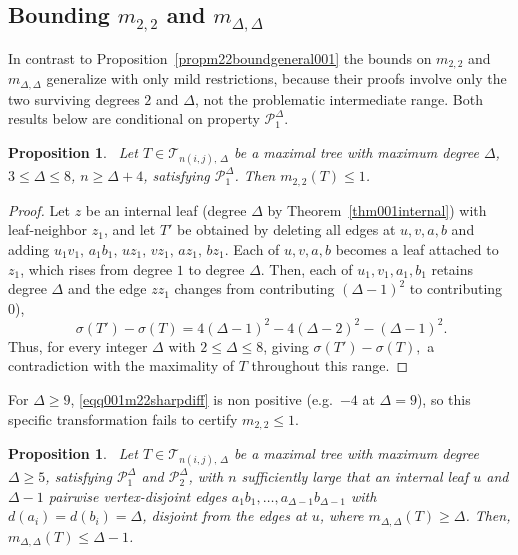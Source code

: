 \documentclass[12pt]{amsart}
\newtheorem{proposition}[theorem]{Proposition}
\newcommand{\TT}{\mathcal{T}}
\begin{document}

\subsection{%
  Bounding \texorpdfstring{$m_{2,2}$}{m(2,2)}
  and \texorpdfstring{$m_{\Delta,\Delta}$}{m(Delta,Delta)}%
}\label{subchart001}

In contrast to Proposition~\ref{propm22boundgeneral001} the bounds on $m_{2,2}$ and
$m_{\Delta,\Delta}$ generalize with only mild restrictions, because their
proofs involve only the two  surviving degrees $2$ and $\Delta$, not the problematic intermediate range. Both results below are conditional on property $\mathcal P_1^\Delta$. 

\begin{proposition}~\label{lem001m22sharpgeneral}
Let $T\in \TT_{n(i,j),\,\Delta}$ be a maximal tree with maximum degree $\Delta$, $3\leqslant\Delta\leqslant 8$,
$n\geqslant\Delta+4$, satisfying $\mathcal P_1^\Delta$. Then $m_{2,2}(T)\leqslant 1$.
\end{proposition}
\begin{proof}
Let $z$ be an internal leaf (degree $\Delta$ by
Theorem~\ref{thm001internal}) with leaf-neighbor $z_1$, and
let $T'$ be obtained by deleting all edges at $u,v,a,b$ and adding
$u_1v_1,\,a_1b_1,\,uz_1,\,vz_1,\,az_1,\,bz_1$. Each of
$u,v,a,b$ becomes a leaf attached to $z_1$, which rises from degree $1$ to degree $\Delta$. Then,  each of $u_1,v_1,a_1,b_1$ retains degree $\Delta$ and  the edge
$zz_1$ changes from contributing $(\Delta-1)^2$ to contributing $0$),
\begin{equation}~\label{eqq001m22sharpdiff}
\sigma(T')-\sigma(T)= 4(\Delta-1)^2 - 4(\Delta-2)^2 - (\Delta-1)^2.
\end{equation}
Thus,  for every integer $\Delta$ with $2\leqslant\Delta\leqslant 8$, giving $\sigma(T')-\sigma(T),$ a contradiction with the maximality of $T$ throughout this range.
\end{proof}

For $\Delta\ge9$, \eqref{eqq001m22sharpdiff} is non positive (e.g.\
$-4$ at $\Delta=9$), so this specific transformation fails to certify $m_{2,2}\leqslant 1$.

\begin{proposition}~\label{prop001mDeltaDeltageneral}
Let $T\in \TT_{n(i,j),\,\Delta}$ be a maximal tree with maximum degree $\Delta\geqslant 5$, satisfying
$\mathcal P_1^\Delta$ and $\mathcal P_2^\Delta$, with $n$ sufficiently large that an internal leaf $u$ and $\Delta-1$ pairwise vertex-disjoint edges $a_1b_1,\dots,a_{\Delta-1}b_{\Delta-1}$ with $d(a_i)=d(b_i)=\Delta$, disjoint from the edges at $u$, where $m_{\Delta,\Delta}(T)\ge\Delta$. Then, $m_{\Delta,\Delta}(T)\leqslant \Delta-1$.
\end{proposition}
\end{document}
